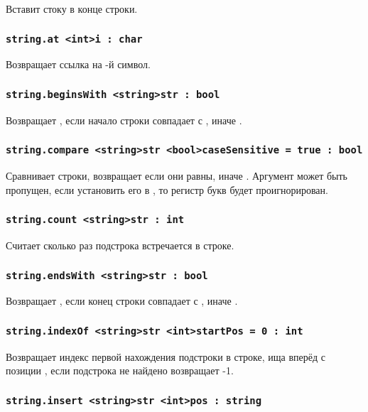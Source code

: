 \documentclass[a4paper, 14pt]{extarticle}
\begin{document}
Вставит стоку в конце строки.

\subsubsection{\lstinline|string.at <int>i : char|}

Возвращает ссылка на -й символ.

\subsubsection{\lstinline|string.beginsWith <string>str : bool|}

Возвращает \true{}, если начало строки совпадает с , иначе \false{}.

\subsubsection{\lstinline|string.compare <string>str <bool>caseSensitive = true : bool|}

Сравнивает строки, возвращает \true{} если они равны, иначе \false{}. Аргумент  может быть пропущен, если установить его в \false{}, то регистр букв будет проигнорирован.

\subsubsection{\lstinline|string.count <string>str : int|}

Считает сколько раз подстрока  встречается в строке.

\subsubsection{\lstinline|string.endsWith <string>str : bool|}

Возвращает \true{}, если конец строки совпадает с , иначе \false{}.

\subsubsection{\lstinline|string.indexOf <string>str <int>startPos = 0 : int|}

Возвращает индекс первой нахождения подстроки  в строке, ища вперёд с позиции , если подстрока не найдено возвращает -1.

\subsubsection{\lstinline|string.insert <string>str <int>pos : string|}
\end{document}
